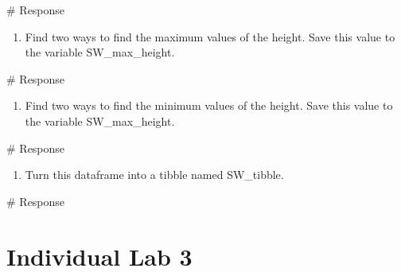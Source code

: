 \documentclass[
  letterpaper,
  DIV=11,
  numbers=noendperiod]{scrreprt}
\newenvironment{Shaded}{\begin{snugshade}}{\end{snugshade}}
\newcommand{\CommentTok}[1]{\textcolor[rgb]{0.37,0.37,0.37}{#1}}
\providecommand{\tightlist}{%
  \setlength{\itemsep}{0pt}\setlength{\parskip}{0pt}}\usepackage{longtable,booktabs,array}
\begin{document}
\begin{Shaded}
\begin{Highlighting}[]
\CommentTok{\# Response}
\end{Highlighting}
\end{Shaded}

\begin{enumerate}
\def\labelenumi{\arabic{enumi}.}
\setcounter{enumi}{8}
\tightlist
\item
  Find two ways to find the maximum values of the height. Save this
  value to the variable SW\_max\_height.
\end{enumerate}

\begin{Shaded}
\begin{Highlighting}[]
\CommentTok{\# Response}
\end{Highlighting}
\end{Shaded}

\begin{enumerate}
\def\labelenumi{\arabic{enumi}.}
\setcounter{enumi}{9}
\tightlist
\item
  Find two ways to find the minimum values of the height. Save this
  value to the variable SW\_max\_height.
\end{enumerate}

\begin{Shaded}
\begin{Highlighting}[]
\CommentTok{\# Response}
\end{Highlighting}
\end{Shaded}

\begin{enumerate}
\def\labelenumi{\arabic{enumi}.}
\setcounter{enumi}{10}
\tightlist
\item
  Turn this dataframe into a tibble named SW\_tibble.
\end{enumerate}

\begin{Shaded}
\begin{Highlighting}[]
\CommentTok{\# Response}
\end{Highlighting}
\end{Shaded}

\chapter*{Individual Lab 3}\label{individual-lab-3}

\end{document}
